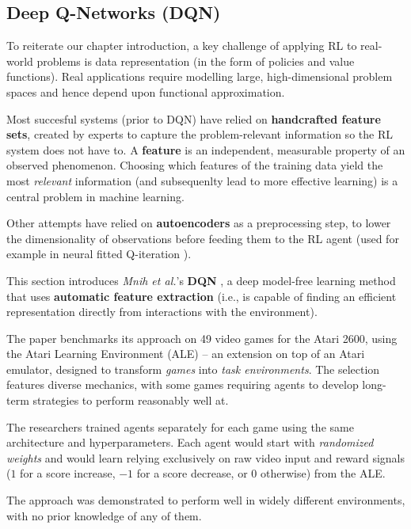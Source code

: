 \subsection{Deep Q-Networks (DQN)} \label{section:dqn}
To reiterate our chapter introduction, a key challenge of applying RL to real-world problems is data representation (in the form of policies and value functions).
Real applications require modelling large, high-dimensional problem spaces and hence depend upon functional approximation.

Most succesful systems (prior to DQN) have relied on \textbf{handcrafted feature sets}, created by experts to capture the problem-relevant information so the RL system does not have to.
A \textbf{feature} is an independent, measurable property of an observed phenomenon.
Choosing which features of the training data yield the most \emph{relevant} information (and subsequenlty lead to more effective learning) is a central problem in machine learning.

Other attempts have relied on \textbf{autoencoders}\footnotemark{} as a preprocessing step, to lower the dimensionality of observations before feeding them to the RL agent (used for example in neural fitted Q-iteration \cite{neural-q-fitted}).

This section introduces \emph{Mnih et al.}'s \textbf{DQN} \cite{atari-dqn}, a deep model-free learning method that uses \textbf{automatic feature extraction} (i.e., is capable of finding an efficient representation directly from interactions with the environment).

The paper benchmarks its approach on 49 video games for the Atari 2600, using the Atari Learning Environment (ALE) \cite{ale-paper} -- an extension on top of an Atari emulator, designed to transform \emph{games} into \emph{task environments}.
The selection features diverse mechanics, with some games requiring agents to develop long-term strategies to perform reasonably well at.

The researchers trained agents separately for each game using the same architecture and hyperparameters.
Each agent would start with \emph{randomized weights} and would learn relying exclusively on raw video input and reward signals ($1$ for a score increase, $-1$ for a score decrease, or $0$ otherwise) from the ALE.

The approach was demonstrated to perform well in widely different environments, with no prior knowledge of any of them.

